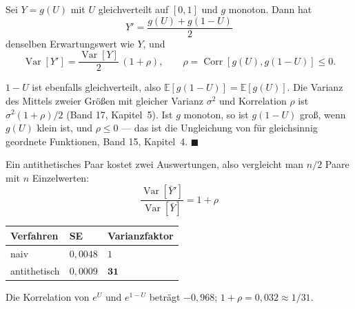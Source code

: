\begin{merksatz}
Sei $Y = g(U)$ mit $U$ gleichverteilt auf $[0,1]$ und $g$ monoton. Dann hat
\[ Y' = \frac{g(U) + g(1-U)}{2} \]
denselben Erwartungswert wie $Y$, und
\[ \operatorname{Var}[Y'] = \frac{\operatorname{Var}[Y]}{2}\,(1+\rho), \qquad \rho = \operatorname{Corr}[g(U), g(1-U)] \le 0 . \]

$1-U$ ist ebenfalls gleichverteilt, also $\mathbb E[g(1-U)] = \mathbb E[g(U)]$. Die Varianz des Mittels zweier Größen mit gleicher Varianz $\sigma^2$ und Korrelation $\rho$ ist $\sigma^2(1+\rho)/2$ (Band 17, Kapitel~5). Ist $g$ monoton, so ist $g(1-U)$ groß, wenn $g(U)$ klein ist, und $\rho\le0$ --- das ist die Ungleichung von  für gleichsinnig geordnete Funktionen, Band 15, Kapitel~4. $\blacksquare$

Ein antithetisches Paar kostet zwei Auswertungen, also vergleicht man $n/2$ Paare mit $n$ Einzelwerten:
\[ \frac{\operatorname{Var}[\bar Y']}{\operatorname{Var}[\bar Y]} = 1+\rho \]

\begin{center}
{\small
\renewcommand{\arraystretch}{1.48}
\begin{tabular}{@{}P{2.8cm}P{2.4cm}P{2.6cm}@{}}
\toprule
\textbf{Verfahren} & \textbf{SE} & \textbf{Varianzfaktor}\\
\midrule
naiv & $0{,}0048$ & $1$\\
antithetisch & $0{,}0009$ & $\mathbf{31}$\\
\bottomrule
\end{tabular}}
\end{center}
Die Korrelation von $e^{U}$ und $e^{1-U}$ beträgt $-0{,}968$; $1+\rho = 0{,}032 \approx 1/31$.

\begin{center}
\begin{minipage}{0.88\textwidth}
\end{minipage}
\end{center}
\end{merksatz}

